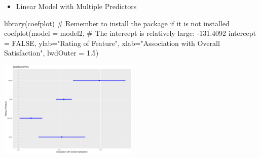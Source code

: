 \documentclass[
  ignorenonframetext,
]{beamer}
\newenvironment{Shaded}{\begin{snugshade}}{\end{snugshade}}
\newcommand{\AttributeTok}[1]{\textcolor[rgb]{0.40,0.45,0.13}{#1}}
\newcommand{\CommentTok}[1]{\textcolor[rgb]{0.37,0.37,0.37}{#1}}
\newcommand{\ConstantTok}[1]{\textcolor[rgb]{0.56,0.35,0.01}{#1}}
\newcommand{\FloatTok}[1]{\textcolor[rgb]{0.68,0.00,0.00}{#1}}
\newcommand{\FunctionTok}[1]{\textcolor[rgb]{0.28,0.35,0.67}{#1}}
\newcommand{\NormalTok}[1]{\textcolor[rgb]{0.00,0.23,0.31}{#1}}
\newcommand{\StringTok}[1]{\textcolor[rgb]{0.13,0.47,0.30}{#1}}
\providecommand{\tightlist}{%
  \setlength{\itemsep}{0pt}\setlength{\parskip}{0pt}}\usepackage{longtable,booktabs,array}
\begin{document}
\begin{frame}[fragile]{}
\label{section-24}
\begin{itemize}
\tightlist
\item
  Linear Model with Multiple Predictors
\end{itemize}

\tiny

\begin{Shaded}
\begin{Highlighting}[]
\FunctionTok{library}\NormalTok{(coefplot) }\CommentTok{\# Remember to install the package if it is not installed}
\FunctionTok{coefplot}\NormalTok{(}\AttributeTok{model =}\NormalTok{ model2, }
         \CommentTok{\# The intercept is relatively large: {-}131.4092 }
         \AttributeTok{intercept =} \ConstantTok{FALSE}\NormalTok{,}
         \AttributeTok{ylab=}\StringTok{"Rating of Feature"}\NormalTok{, }
         \AttributeTok{xlab=}\StringTok{"Association with Overall Satisfaction"}\NormalTok{,}
         \AttributeTok{lwdOuter =} \FloatTok{1.5}\NormalTok{)}
\end{Highlighting}
\end{Shaded}

\begin{center}
\includegraphics[width=0.5\textwidth,height=\textheight]{007_identifying_drivers_of_outcomes_linear_models_files/figure-beamer/unnamed-chunk-22-1.pdf}
\end{center}
\end{frame}
\end{document}
